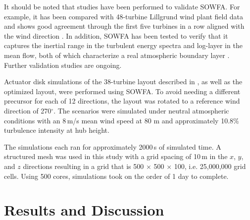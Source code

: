 \documentclass[conf]{new-aiaa}
\begin{document}
It should be noted that studies have been performed to validate SOWFA.  For example, it has been compared with 48-turbine Lillgrund wind plant field data and shows good agreement through the first five turbines in a row aligned with the wind direction \cite{churchfield2012large}.  In addition, SOWFA has been tested to verify that it captures the inertial range in the turbulent energy spectra and log-layer in the mean flow, both of which characterize a real atmospheric boundary layer \cite{churchfield2012numerical}.  Further validation studies are ongoing.  

Actuator disk simulations of the 38-turbine layout described in , as well as the  optimized layout, were performed using SOWFA.  To avoid needing a different precursor for each of  12 directions, the layout was rotated to a reference wind direction of 270$^\circ$.  The scenarios were simulated under neutral atmospheric conditions with an 8\,m/s mean wind speed at 80 m and approximately 10.8$\%$ turbulence intensity at hub height.

The simulations each ran for approximately 2000\,s of simulated time.  A structured mesh was used in this study with a grid spacing of 10\,m in the $x$, $y$, and $z$ directions resulting in a grid that is 500 $\times$ 500 $\times$ 100, i.e. 25,000,000 grid cells.  Using 500 cores, simulations took on the order of 1 day to complete.  




\section{Results and Discussion}
\end{document}
